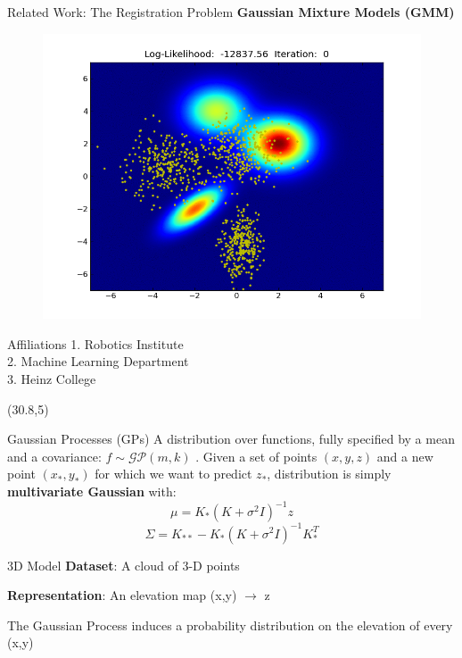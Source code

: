 \documentclass[final]{beamer}
\begin{document}
\begin{frame}{}
\begin{textblock}{27}
\begin{block}{Related Work: The Registration Problem}
{\bf Gaussian Mixture Models (GMM) \cite{jian_robust_5555}}
\begin{figure}
\includegraphics[width=10in]{register2D.png}
\end{figure}

\end{block}

\begin{block}{Affiliations}
1. Robotics Institute \\
2. Machine Learning Department \\
3. Heinz College
\end{block}
\end{textblock}

\begin{textblock}{27.5}(30.8,5)
\begin{block}{Gaussian Processes (GPs)}
A distribution over functions, fully specified by a mean and a covariance:
$f \sim \mathcal{GP}(m,k)$ \cite{rasmussen2006gaussian}. Given a set of points $(x,y,z)$ and a new point $(x_*,y_*)$ for which we want to predict $z_*$, 
distribution is simply {\bf multivariate Gaussian} with:
$$\mu = K_* (K + \sigma^2 I)^{-1}z$$
$$\Sigma = K_{**} - K_* (K + \sigma^2 I)^{-1} K_*^T$$
\end{block}

\begin{block}{3D Model}
{\bf Dataset}: A cloud of 3-D points

{\bf Representation}: An elevation map (x,y) $\rightarrow$ z

The Gaussian Process induces a probability distribution on the elevation of every (x,y)


\end{block}
\end{textblock}
\end{frame}
\end{document}
